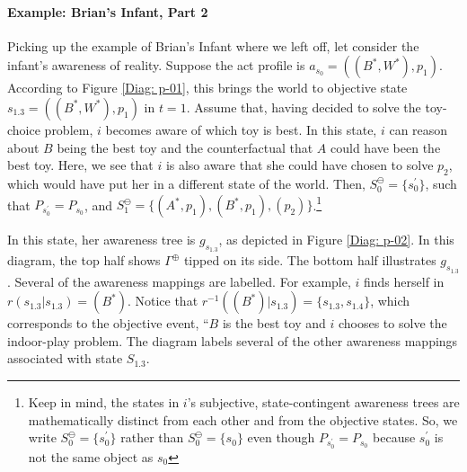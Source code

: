\documentclass[
11pt,
titlepage,
reqno,
]{article}%
\theoremstyle{definition}
\begin{document}
%	
	
\paragraph{Example: Brian's Infant, Part 2}	
Picking up the example of Brian's Infant where we left off, let consider the infant's awareness of reality.
Suppose the act profile is $a_{s_0}=((B^\ast,W^\ast),p_1)$.
According to Figure \ref{Diag: p-01}, this brings the world to objective state $s_{1.3}=((B^\ast,W^\ast),p_1)$ in  $t=1$.
Assume that, having decided to solve the toy-choice problem, $i$ becomes aware of which toy is best.
In this state, $i$ can reason about $B$ being the best toy and the counterfactual that $A$ could have been the best toy.
Here, we see that $i$ is also aware that she could have chosen to solve $p_2$, which would have put her in a different state of the world. 
Then, $S^\ominus_0=\{s^\prime_0\}$, such that $P_{s^\prime_0}=P_{s_0}$, and  $S^\ominus_1=\{(A^\ast,p_1),(B^\ast,p_1),(p_2)\}$.\footnote
{
	Keep in mind, the states in $i$'s subjective, state-contingent awareness trees are mathematically distinct from each other and from the objective states. So, we write  $S^\ominus_0=\{s^\prime_0\}$ rather than $S^\ominus_0=\{s_0\}$ even though $P_{s^\prime_0}=P_{s_0}$ because $s^\prime_0$ is not the same object as $s_0$
}

In this state, her awareness tree is $g_{s_{1.3}}$, as depicted in Figure \ref{Diag: p-02}.
In this diagram, the top half shows $\Gamma^\oplus$ tipped on its side. 
The bottom half illustrates $g_{s_{1.3}}$.
Several of the awareness mappings are labelled.
For example, $i$ finds herself in $r(s_{1.3}|s_{1.3})=(B^\ast)$.
Notice that $r^{-1}((B^\ast)|s_{1.3})=\{s_{1.3},s_{1.4}\}$, which corresponds to the objective event, ``$B$ is the best toy and $i$ chooses to solve the indoor-play problem.
The diagram labels several of the other awareness mappings associated with state $S_{1.3}$.
\end{document}
